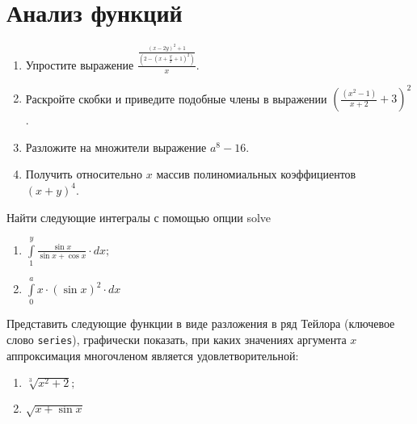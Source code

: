 \documentclass[14pt,a4paper]{article}
\begin{document}
\section{Анализ функций}
\begin{enumerate}
	\item Упростите выражение $\frac{\frac{(x-2 y)^2+1}{\left(2-\left(x+\frac{y}{x}+1\right)^2\right)}}{x}$.
	\item Раскройте скобки и приведите подобные члены в выражении $\left(\frac{\left(x^2-1\right)}{x+2}+3\right)^2$.
	\item Разложите на множители выражение $a^{8}-16$.
	\item Получить относительно $x$ массив полиномиальных коэффициентов \\ $(x+y)^4$.
\end{enumerate}

\noindent  Найти следующие интегралы с помощью опции solve
\begin{multicols}{2}
	\begin{enumerate}
		\item $\int\limits_1^y \frac{\sin x}{\sin x+\cos x} \cdot d x;$
		\item $\int\limits_0^a x \cdot(\sin x)^2 \cdot d x$
	\end{enumerate}
\end{multicols}
\noindent Представить следующие функции в виде разложения в ряд Тейлора (ключевое слово \texttt{series}), графически показать, при каких значениях аргумента $x$ аппроксимация многочленом является удовлетворительной:
\begin{multicols}{2}
	\begin{enumerate}
		\item $\sqrt[3]{x^2+2};$ 
		\item $\sqrt{x+\sin{x}}$
	\end{enumerate}
\end{multicols}

\nocite{Plis2003,Krestlev2010,MathCADshortcuts,Ochkov2016}
\printbibliography[title={Рекомендуемая литература}]
\end{document}

